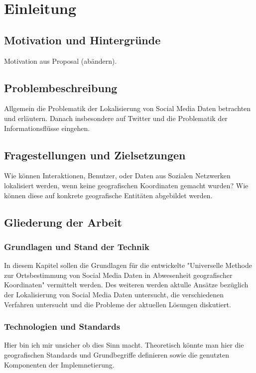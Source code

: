 \chapter{Einleitung}

\section{Motivation und Hintergründe}
Motivation aus Proposal (abändern).

\section{Problembeschreibung} 
Allgemein die Problematik der Lokalisierung von Social Media Daten betrachten und erläutern. 
Danach insbesondere auf Twitter und die Problematik der Informationsflüsse eingehen.

\section{Fragestellungen und Zielsetzungen}
Wie können Interaktionen, Benutzer, oder Daten aus Sozialen Netzwerken lokalisiert werden, wenn keine geografischen Koordinaten gemacht wurden? 
Wie können diese auf konkrete geografische Entitäten abgebildet werden. 

\section{Gliederung der Arbeit}

\subsection{Grundlagen und Stand der Technik}
In diesem Kapitel sollen die Grundlagen für die entwickelte   "Universelle Methode zur Ortsbestimmung von Social Media Daten in Abwesenheit geografischer Koordinaten" vermittelt werden. 
Des weiteren werden aktulle Ansätze bezüglich der Lokalisierung von Social Media Daten untersucht, die verschiedenen Verfahren untersucht und die Probleme der aktuellen Lösungen diskutiert.

\subsection{Technologien und Standards}
Hier bin ich mir unsicher ob dies Sinn macht. 
Theoretisch könnte man hier die geografischen Standards und Grundbegriffe definieren sowie die genutzten Komponenten der Implemnetierung.

